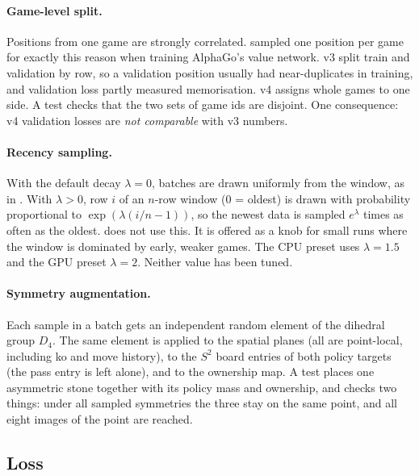 \paragraph{Game-level split.}
Positions from one game are strongly correlated.
\citet{silver2016mastering} sampled one position per game for exactly this reason when
training AlphaGo's value network. v3 split train and validation by row, so a validation
position usually had near-duplicates in training, and validation loss partly measured
memorisation. v4 assigns whole games to one side. A test checks that the two sets of game
ids are disjoint. One consequence: v4 validation losses are \emph{not comparable} with v3
numbers.

\paragraph{Recency sampling.}
With the default decay $\lambda=0$, batches are drawn uniformly from the window, as in
\katago{}. With $\lambda>0$, row $i$ of an $n$-row window (0 = oldest) is drawn with
probability proportional to $\exp(\lambda(i/n-1))$, so the newest data is sampled
$e^{\lambda}$ times as often as the oldest. \katago{} does not use this. It is offered as
a knob for small runs where the window is dominated by early, weaker games. The CPU preset
uses $\lambda=1.5$ and the GPU preset $\lambda=2$. Neither value has been tuned.

\paragraph{Symmetry augmentation.}
Each sample in a batch gets an independent random element of the dihedral group $D_4$.
The same element is applied to the spatial planes (all are point-local, including ko and
move history), to the $S^2$ board entries of both policy targets (the pass entry is left
alone), and to the ownership map. A test places one asymmetric stone together with its
policy mass and ownership, and checks two things: under all sampled symmetries the three
stay on the same point, and all eight images of the point are reached.

\subsection{Loss}\label{sec:learner-loss}\label{sec:learner-masking}

